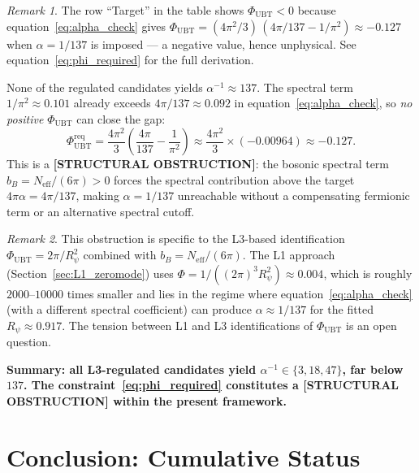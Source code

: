 \documentclass[11pt,a4paper]{article}
\theoremstyle{definition}
\theoremstyle{remark}
\newtheorem{remark}{Remark}
\begin{document}
\begin{remark}
  The row ``Target'' in the table shows $\Phi_{\mathrm{UBT}} < 0$ because
  equation~\eqref{eq:alpha_check} gives
  $\Phi_{\mathrm{UBT}} = (4\pi^2/3)\,(4\pi/137 - 1/\pi^2) \approx -0.127$
  when $\alpha = 1/137$ is imposed --- a negative value, hence unphysical.
  See equation~\eqref{eq:phi_required} for the full derivation.
\end{remark}

\medskip

None of the regulated candidates yields $\alpha^{-1} \approx 137$.
The spectral term $1/\pi^2 \approx 0.101$ already exceeds
$4\pi/137 \approx 0.092$ in equation~\eqref{eq:alpha_check},
so \emph{no positive} $\Phi_{\mathrm{UBT}}$ can close the gap:
\begin{equation}
  \Phi_{\mathrm{UBT}}^{\mathrm{req}}
  = \frac{4\pi^2}{3}\!\left(\frac{4\pi}{137} - \frac{1}{\pi^2}\right)
  \approx \frac{4\pi^2}{3}\times(-0.00964)
  \approx -0.127.
  \label{eq:phi_required}
\end{equation}
This is a \textbf{[STRUCTURAL OBSTRUCTION]}: the bosonic spectral term
$b_B = N_{\mathrm{eff}}/(6\pi) > 0$ forces the spectral contribution
above the target $4\pi\alpha = 4\pi/137$, making $\alpha = 1/137$
unreachable without a compensating fermionic term or an alternative
spectral cutoff.

\begin{remark}
  This obstruction is specific to the L3-based identification
  $\Phi_{\mathrm{UBT}} = 2\pi/R_\psi^2$ combined with
  $b_B = N_{\mathrm{eff}}/(6\pi)$.
  The L1 approach (Section~\ref{sec:L1_zeromode}) uses
  $\Phi = 1/((2\pi)^3 R_\psi^2) \approx 0.004$, which is
  roughly $2000$--$10000$ times smaller and lies in the regime
  where equation~\eqref{eq:alpha_check} (with a different spectral
  coefficient) can produce $\alpha \approx 1/137$ for the fitted
  $R_\psi \approx 0.917$.
  The tension between L1 and L3 identifications of $\Phi_{\mathrm{UBT}}$
  is an open question.
\end{remark}

\medskip
\textbf{Summary: all L3-regulated candidates yield
$\alpha^{-1} \in \{3, 18, 47\}$, far below $137$.
The constraint~\eqref{eq:phi_required} constitutes a
\textbf{[STRUCTURAL OBSTRUCTION]} within the present framework.}

\section{Conclusion: Cumulative Status}
\label{sec:conclusion}
\end{document}
